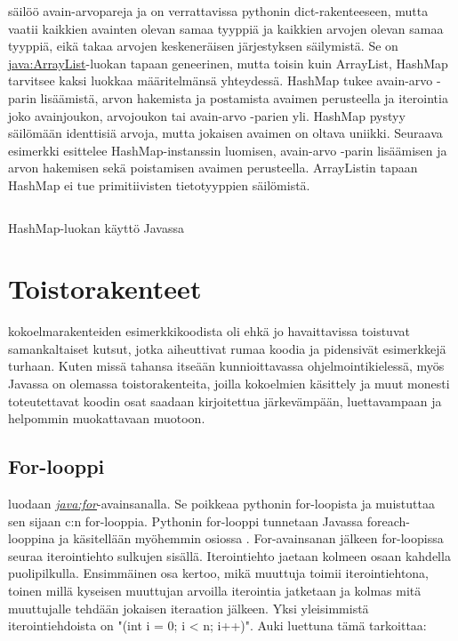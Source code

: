 \documentclass{tufte-book}
\newcommand{\java}[1]{\underline{\gls{java:#1}}}
\newcommand{\newjava}[1]{\textit{\java{#1}}}
\newcommand{\code}[3]{
\begin{listing}
    \inputminted{java}{OhjelmointiopasEsimerkit/src/#1/#2.java}
    \caption{#3}
    \label{Java-#1-#2}
\end{listing}
}
\begin{document}
\newthought{\java{HashMap}-luokka} säilöö avain-arvopareja ja on verrattavissa pythonin
dict-rakenteeseen, mutta vaatii kaikkien avainten olevan samaa tyyppiä ja kaikkien arvojen olevan
samaa tyyppiä, eikä takaa arvojen keskeneräisen järjestyksen säilymistä. Se on 
\java{ArrayList}-luokan tapaan geneerinen, mutta toisin kuin ArrayList, HashMap tarvitsee kaksi
luokkaa määritelmänsä yhteydessä. HashMap tukee avain-arvo -parin lisäämistä, arvon hakemista ja
postamista avaimen perusteella ja iterointia joko avainjoukon, arvojoukon tai avain-arvo -parien
yli. HashMap pystyy säilömään identtisiä arvoja, mutta jokaisen avaimen on oltava uniikki.
Seuraava esimerkki esittelee HashMap-instanssin luomisen, avain-arvo -parin lisäämisen ja
arvon hakemisen sekä poistamisen avaimen perusteella. ArrayListin tapaan HashMap ei tue
primitiivisten tietotyyppien säilömistä.

\code{week3/basicexamples}{HashMapUsage}{HashMap-luokan käyttö Javassa}


\section{Toistorakenteet}
\label{loopeista}

 kokoelmarakenteiden esimerkkikoodista oli ehkä jo havaittavissa
toistuvat samankaltaiset kutsut, jotka aiheuttivat rumaa koodia ja pidensivät esimerkkejä turhaan.
Kuten missä tahansa itseään kunnioittavassa ohjelmointikielessä, myös Javassa on olemassa
toistorakenteita, joilla kokoelmien käsittely ja muut monesti toteutettavat koodin osat saadaan
kirjoitettua järkevämpään, luettavampaan ja helpommin muokattavaan muotoon.

\subsection{For-looppi}
\label{for}

 luodaan \newjava{for}-avainsanalla. Se poikkeaa pythonin for-loopista
ja muistuttaa sen sijaan c:n for-looppia. Pythonin for-looppi tunnetaan Javassa foreach-looppina
ja käsitellään myöhemmin osiossa . For-avainsanan jälkeen for-loopissa seuraa
iterointiehto sulkujen sisällä. Iterointiehto jaetaan kolmeen osaan kahdella puolipilkulla.
Ensimmäinen osa kertoo, mikä muuttuja toimii iterointiehtona, toinen millä kyseisen muuttujan
arvoilla iterointia jatketaan ja kolmas mitä muuttujalle tehdään jokaisen iteraation jälkeen. Yksi
yleisimmistä iterointiehdoista on "(int i = 0; i < n; i++)". Auki luettuna tämä tarkoittaa:
\end{document}

